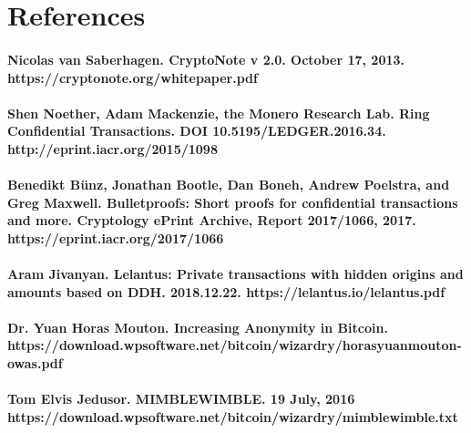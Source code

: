 \documentclass{article}
\begin{document}
\section{References}

\paragraph{Nicolas van Saberhagen. CryptoNote v 2.0. October 17, 2013. https://cryptonote.org/whitepaper.pdf}

\paragraph{Shen Noether, Adam Mackenzie, the Monero Research Lab. Ring Confidential Transactions. DOI 10.5195/LEDGER.2016.34. http://eprint.iacr.org/2015/1098}

\paragraph{Benedikt Bünz, Jonathan Bootle, Dan Boneh, Andrew Poelstra, and Greg Maxwell. Bulletproofs: Short proofs for confidential transactions and more. Cryptology ePrint Archive, Report 2017/1066, 2017. https://eprint.iacr.org/2017/1066}

\paragraph{Aram Jivanyan. Lelantus: Private transactions with hidden origins and amounts based on DDH. 2018.12.22. https://lelantus.io/lelantus.pdf}

\paragraph{Dr. Yuan Horas Mouton. Increasing Anonymity in Bitcoin. https://download.wpsoftware.net/bitcoin/wizardry/horasyuanmouton-owas.pdf}

\paragraph{Tom Elvis Jedusor. MIMBLEWIMBLE. 19 July, 2016 https://download.wpsoftware.net/bitcoin/wizardry/mimblewimble.txt}
\end{document}
